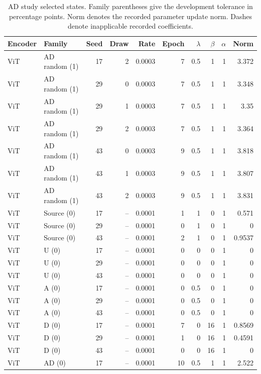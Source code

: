 \begin{table}[t]
\centering
\scriptsize
\setlength{\tabcolsep}{3pt}
\begin{tabular}{llrrrrrrrr}
\toprule
Encoder & Family & Seed & Draw & Rate & Epoch & $\lambda$ & $\beta$ & $\alpha$ & Norm\\
\midrule
ViT & AD random (1) & 17 & 2 & 0.0003 & 7 & 0.5 & 1 & 1 & 3.372\\
ViT & AD random (1) & 29 & 0 & 0.0003 & 7 & 0.5 & 1 & 1 & 3.348\\
ViT & AD random (1) & 29 & 1 & 0.0003 & 7 & 0.5 & 1 & 1 & 3.35\\
ViT & AD random (1) & 29 & 2 & 0.0003 & 7 & 0.5 & 1 & 1 & 3.364\\
ViT & AD random (1) & 43 & 0 & 0.0003 & 9 & 0.5 & 1 & 1 & 3.818\\
ViT & AD random (1) & 43 & 1 & 0.0003 & 9 & 0.5 & 1 & 1 & 3.807\\
ViT & AD random (1) & 43 & 2 & 0.0003 & 9 & 0.5 & 1 & 1 & 3.831\\
ViT & Source (0) & 17 & -- & 0.0001 & 1 & 1 & 0 & 1 & 0.571\\
ViT & Source (0) & 29 & -- & 0.0001 & 0 & 1 & 0 & 1 & 0\\
ViT & Source (0) & 43 & -- & 0.0001 & 2 & 1 & 0 & 1 & 0.9537\\
ViT & U (0) & 17 & -- & 0.0001 & 0 & 0 & 0 & 1 & 0\\
ViT & U (0) & 29 & -- & 0.0001 & 0 & 0 & 0 & 1 & 0\\
ViT & U (0) & 43 & -- & 0.0001 & 0 & 0 & 0 & 1 & 0\\
ViT & A (0) & 17 & -- & 0.0001 & 0 & 0.5 & 0 & 1 & 0\\
ViT & A (0) & 29 & -- & 0.0001 & 0 & 0.5 & 0 & 1 & 0\\
ViT & A (0) & 43 & -- & 0.0001 & 0 & 0.5 & 0 & 1 & 0\\
ViT & D (0) & 17 & -- & 0.0001 & 7 & 0 & 16 & 1 & 0.8569\\
ViT & D (0) & 29 & -- & 0.0001 & 1 & 0 & 16 & 1 & 0.4591\\
ViT & D (0) & 43 & -- & 0.0001 & 0 & 0 & 16 & 1 & 0\\
ViT & AD (0) & 17 & -- & 0.0001 & 10 & 0.5 & 1 & 1 & 2.522\\
\bottomrule
\end{tabular}
\caption{AD study selected states. Family parentheses give the development tolerance in percentage points. Norm denotes the recorded parameter update norm. Dashes denote inapplicable recorded coefficients.}\label{tab:adselected20}
\end{table}


